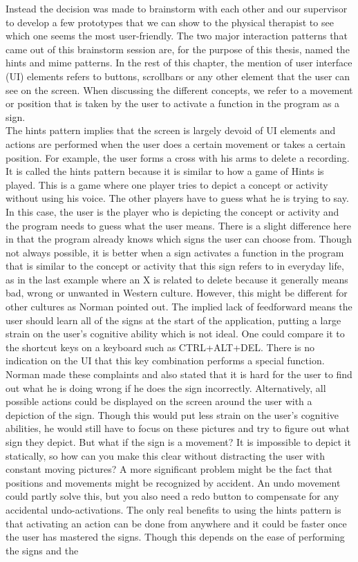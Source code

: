 Instead the decision was made to brainstorm with each other and our supervisor to develop a few prototypes that we can show to the physical therapist to see which one seems the most user-friendly. The two major interaction patterns that came out of this brainstorm session are, for the purpose of this thesis, named the hints and mime patterns. In the rest of this chapter, the mention of user interface (UI) elements refers to buttons, scrollbars or any other element that the user can see on the screen. When discussing the different concepts, we refer to a movement or position that is taken by the user to activate a function in the program as a sign.\\

The hints pattern implies that the screen is largely devoid of UI elements and actions are performed when the user does a certain movement or takes a certain position. For example, the user forms a cross with his arms to delete a recording. It is called the hints pattern because it is similar to how a game of Hints is played. This is a game where one player tries to depict a concept or activity without using his voice. The other players have to guess what he is trying to say. In this case, the user is the player who is depicting the concept or activity and the program needs to guess what the user means. There is a slight difference here in that the program already knows which signs the user can choose from. Though not always possible, it is better when a sign activates a function in the program that is similar to the concept or activity that this sign refers to in everyday life, as in the last example where an X is related to delete because it generally means bad, wrong or unwanted in Western culture. However, this might be different for other cultures as Norman \cite{Norman2010} pointed out. The implied lack of feedforward means the user should learn all of the signs at the start of the application, putting a large strain on the user's cognitive ability which is not ideal. One could compare it to the shortcut keys on a keyboard such as CTRL+ALT+DEL. There is no indication on the UI that this key combination performs a special function. Norman \cite{Norman2010} made these complaints and also stated that it is hard for the user to find out what he is doing wrong if he does the sign incorrectly. Alternatively, all possible actions could be displayed on the screen around the user with a depiction of the sign. Though this would put less strain on the user's cognitive abilities, he would still have to focus on these pictures and try to figure out what sign they depict. But what if the sign is a movement? It is impossible to depict it statically, so how can you make this clear without distracting the user with constant moving pictures? A more significant problem might be the fact that positions and movements might be recognized by accident. An undo movement could partly solve this, but you also need a redo button to compensate for any accidental undo-activations. The only real benefits to using the hints pattern is that activating an action can be done from anywhere and it could be faster once the user has mastered the signs. Though this depends on the ease of performing the signs and the 
